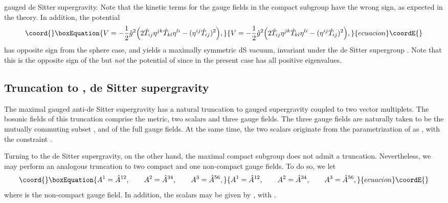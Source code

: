 \documentclass[a4paper,12pt]{article}
\begin{document}
gauged de Sitter supergravity.  Note that the kinetic terms for the
gauge fields in the compact subgroup \coordHE{}
have the wrong sign, as expected in the \myHighlight{$*$}\coordHE{} theory.  In addition,
the potential
%
\begin{equation}\coord{}\boxEquation{
V=-\frac{1}{2}\hat g^2\Bigr(2\hat T_{ij}\eta^{jk}\hat T_{kl}\eta^{li}
-(\eta^{ij}\hat T_{ij})^2\Bigr),
}{
V=-\frac{1}{2}\hat g^2\Bigr(2\hat T_{ij}\eta^{jk}\hat T_{kl}\eta^{li}
-(\eta^{ij}\hat T_{ij})^2\Bigr),
}{ecuacion}\coordE{}\end{equation}
%
has opposite sign from the sphere case, and yields a maximally symmetric
dS\coordHE{} vacuum, invariant under the de Sitter supergroup \coordHE{}.
Note that this is the opposite sign of the \coordHE{} but {\it not} the
\coordHE{} potential of \cite{Gunaydin:1984qu,Pernici:ju,Gunaydin} since in
the present case \coordHE{} has all positive eigenvalues.

\subsection{Truncation to \coordHE{}, \coordHE{} de Sitter supergravity}

The maximal \coordHE{}  \coordHE{} gauged anti-de Sitter supergravity has a
natural \coordHE{} truncation to \coordHE{} gauged supergravity coupled to two
vector multiplets.  The bosonic fields of this truncation comprise the
metric, two scalars and three gauge fields.  The three gauge fields are
naturally taken to be the mutually commuting subset \coordHE{}, \coordHE{} and
\coordHE{} of the full \coordHE{} gauge fields.  At the same time, the two
scalars originate from the parametrization of \coordHE{} as
\coordHE{}, with the constraint \coordHE{}.

Turning to the de Sitter supergravity, on the other hand, the
maximal compact subgroup \coordHE{} does not admit a \coordHE{}
truncation.  Nevertheless, we may perform an analogous truncation to
two compact and one non-compact \coordHE{} gauge fields.  To do so, we let
%
\begin{equation}\coord{}\boxEquation{
A^1=\hat A^{12},\qquad
A^2=\hat A^{34},\qquad
A^3=\hat A^{56},
}{
A^1=\hat A^{12},\qquad
A^2=\hat A^{34},\qquad
A^3=\hat A^{56},
}{ecuacion}\coordE{}\end{equation}
%
where \coordHE{} is the non-compact gauge field.  In addition, the
scalars may be given by \coordHE{}, with \coordHE{}.
\end{document}
